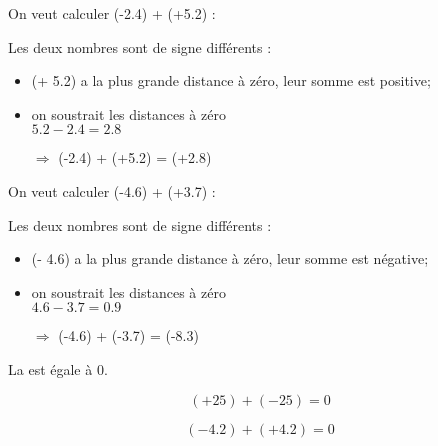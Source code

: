 \begin{myexs}
		On veut calculer (-\num{2.4}) + (+\num{5.2}) :
		
		Les deux nombres sont de signe différents :
		\begin{itemize}
			\item (+ \num{5.2}) a la plus grande distance à zéro, leur somme est positive;
			\item on soustrait les distances à zéro \\ $\num{5.2} - \num{2.4} = \num{2.8}$
			\item[$\Rightarrow$] (-\num{2.4}) + (+\num{5.2}) = (+\num{2.8})
		\end{itemize} 
		
		\vspace*{1cm}
		
		On veut calculer (-\num{4.6}) + (+\num{3.7}) :
		
		Les deux nombres sont de signe différents :
		\begin{itemize}
			\item (- \num{4.6}) a la plus grande distance à zéro, leur somme est négative;
			\item on soustrait les distances à zéro \\ $\num{4.6} - \num{3.7} = \num{0.9}$
			\item[$\Rightarrow$] (-\num{4.6}) + (-\num{3.7}) = (-\num{8.3})
		\end{itemize} 
\end{myexs}



\begin{myprop}
	La  est égale à 0.

\end{myprop}

\begin{myexs}

	\begin{multicols}{2}
		\begin{equation*}
			(+ 25) + (-25) = 0
		\end{equation*}
		
		\begin{equation*}
			(- \num{4.2}) + (+ \num{4.2}) = 0
		\end{equation*}
	\end{multicols}


\end{myexs}

